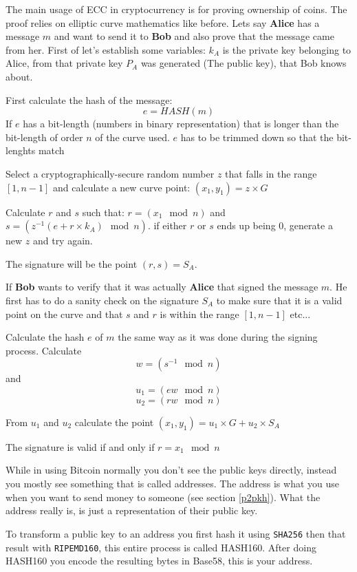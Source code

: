 The main usage of ECC in cryptocurrency is for proving ownership of coins. The proof relies 
on elliptic curve mathematics like before. Lets say \textbf{Alice} has a message $m$ and want 
to send it to \textbf{Bob} and also prove that the message came from her. First of let's 
establish some variables: $k_A$ is the private key belonging to Alice, from that private 
key $P_A$ was generated (The public key), that Bob knows about. 

First calculate the hash of the message:
$$e=HASH(m)$$
If $e$ has a bit-length (numbers in binary representation) that is longer than the bit-length 
of order $n$ of the curve used. $e$ has to be trimmed down so that the bit-lenghts match

Select a cryptographically-secure random number $z$ that falls in the range $[1, n-1]$ and 
calculate a new curve point: $(x_1, y_1) = z \times G$

Calculate $r$ and $s$ such that: $r = (x_1 \mod n)$ and $s = (z^{-1} (e + r \times k_A) \mod n)$. 
if either $r$ or $s$ ends up being 0, generate a new $z$ and try again.

The signature will be the point $(r, s) = S_A$.

\label{signature_validation}
If \textbf{Bob} wants to verify that it was actually \textbf{Alice} that signed the message $m$. 
He first has to do a sanity check on the signature $S_A$ to make sure that it is a valid point on 
the curve and that $s$ and $r$ is within the range $[1, n-1]$ etc... 

Calculate the hash $e$ of $m$ the same way as it was done during the signing process. Calculate 
$$w=(s^{-1} \mod n)$$ and $$u_1 = (ew \mod n)$$ $$u_2 = (rw \mod n)$$

From $u_1$ and $u_2$ calculate the point $(x_1, y_1) = u_1 \times G + u_2 \times S_A$ 

The signature is valid if and only if $r = x_1 \mod n$

While in using Bitcoin normally you don't see the public keys directly, instead you mostly see something that is called addresses. The address is what you use when you want to send money to someone (see section \ref{p2pkh}). What the address really is, is just a representation of their public key.  

To transform a public key to an address you first hash it using \texttt{SHA256} then that result with \texttt{RIPEMD160}, this entire process is called HASH160. After doing HASH160 you encode the resulting bytes in Base58, this is your address. 

